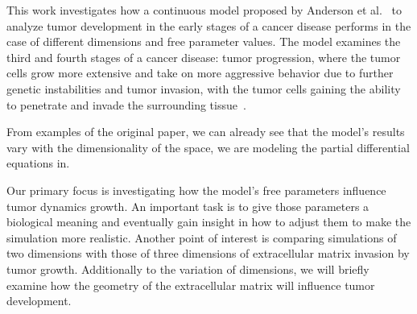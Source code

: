 This work investigates how a continuous model proposed by Anderson et al.~\cite{anderson_continuous_1998,anderson_mathematical_2000} to analyze tumor development in the early stages of a cancer disease performs in the case of different dimensions and free parameter values. The model examines the third and fourth stages of a cancer disease: tumor progression, where the tumor cells grow more extensive and take on more aggressive behavior due to further genetic instabilities and tumor invasion, with the tumor cells gaining the ability to penetrate and invade the surrounding tissue~\cite{10.1158/2159-8290.CD-21-1059}. 

From examples of the original paper, we can already see that the model's results vary with the dimensionality of the space, we are modeling the partial differential equations in. 

Our primary focus is investigating how the model's free parameters influence tumor dynamics growth. An important task is to give those parameters a biological meaning and eventually gain insight in how to adjust them to make the simulation more realistic. Another point of interest is comparing simulations of two dimensions with those of three dimensions of extracellular matrix invasion by tumor growth. Additionally to the variation of dimensions, we will briefly examine how the geometry of the extracellular matrix will influence tumor development.